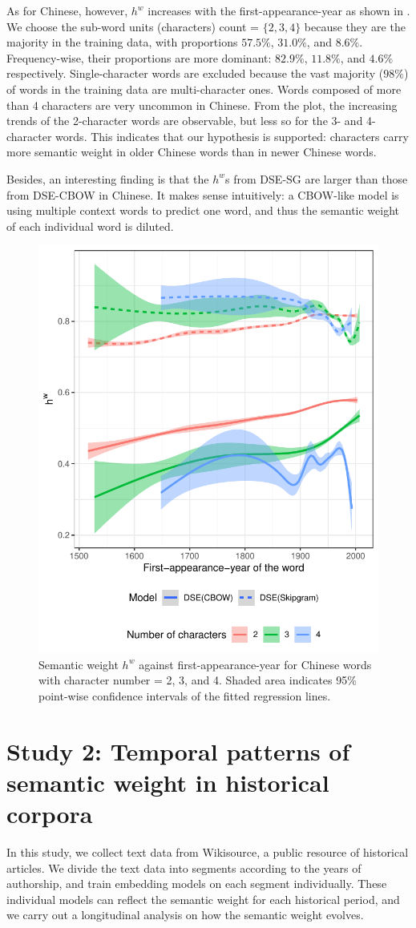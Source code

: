 \documentclass[output=paper]{langsci/langscibook}
\begin{document}
As for Chinese, however, $h^w$ increases with the first-appearance-year as shown in . We choose the sub-word units (characters) count = $\{2,3,4\}$ because they are the majority in the training data, with proportions $57.5\%$, $31.0\%$, and $8.6\%$. Frequency-wise, their proportions are more dominant: $82.9\%$, $11.8\%$, and $4.6\%$ respectively. 
Single-character words are excluded because the vast majority ($98\%$) of words in the training data are multi-character ones.
Words composed of more than 4 characters are very uncommon in Chinese. 
From the plot, the increasing trends of the 2-character words are observable, but less so for the 3- and 4-character words.
This indicates that our hypothesis is supported: characters carry more semantic weight in older Chinese words than in newer Chinese words. 

Besides, an interesting finding is that the $h^w$s from DSE-SG are larger than those from DSE-CBOW in Chinese. It makes sense intuitively: a CBOW-like model is using multiple context words to predict one word, and thus the semantic weight of each individual word is diluted. 

\begin{figure}
\includegraphics[width=0.55\linewidth]{figures/XU_hw_year_charNum234_cbow&sg_wikifull.pdf}
\caption{Semantic weight $h^w$ against first-appearance-year for Chinese words with character number = 2, 3, and 4. Shaded area indicates 95\% point-wise confidence intervals of the fitted regression lines.}\label{fig:hw_year_charNum234}
\end{figure}


\section{Study 2: Temporal patterns of semantic weight in historical corpora}\label{sec:study2}
In this study, we collect text data from Wikisource, a public resource of historical articles. We divide the text data into segments according to the years of authorship, and train embedding models on each segment individually. 
These individual models can reflect the semantic weight for each historical period, and we carry out a longitudinal analysis on how the semantic weight evolves. 
\end{document}
